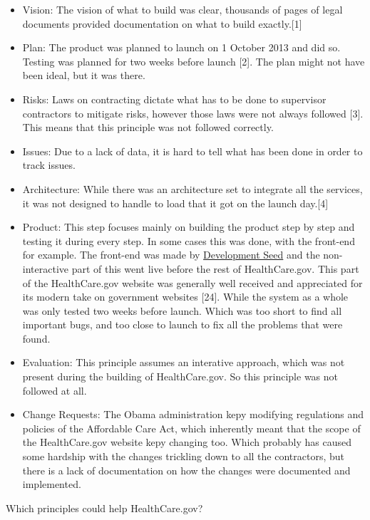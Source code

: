 \documentclass[]{article}
\begin{document}
\begin{itemize}
\item
  Vision: The vision of what to build was clear, thousands of pages of
  legal documents provided documentation on what to build
  exactly.{[}1{]}
\item
  Plan: The product was planned to launch on 1 October 2013 and did so.
  Testing was planned for two weeks before launch {[}2{]}. The plan
  might not have been ideal, but it was there.
\item
  Risks: Laws on contracting dictate what has to be done to supervisor
  contractors to mitigate risks, however those laws were not always
  followed {[}3{]}. This means that this principle was not followed
  correctly.
\item
  Issues: Due to a lack of data, it is hard to tell what has been done
  in order to track issues.
\item
  Architecture: While there was an architecture set to integrate all the
  services, it was not designed to handle to load that it got on the
  launch day.{[}4{]}
\item
  Product: This step focuses mainly on building the product step by step
  and testing it during every step. In some cases this was done, with
  the front-end for example. The front-end was made by
  \href{https://developmentseed.org/}{Development Seed} and the
  non-interactive part of this went live before the rest of
  HealthCare.gov. This part of the HealthCare.gov website was generally
  well received and appreciated for its modern take on government
  websites {[}24{]}. While the system as a whole was only tested two
  weeks before launch. Which was too short to find all important bugs,
  and too close to launch to fix all the problems that were found.
\item
  Evaluation: This principle assumes an interative approach, which was
  not present during the building of HealthCare.gov. So this principle
  was not followed at all.
\item
  Change Requests: The Obama administration kepy modifying regulations
  and policies of the Affordable Care Act, which inherently meant that
  the scope of the HealthCare.gov website kepy changing too. Which
  probably has caused some hardship with the changes trickling down to
  all the contractors, but there is a lack of documentation on how the
  changes were documented and implemented.
\end{itemize}

Which principles could help HealthCare.gov?
\end{document}

